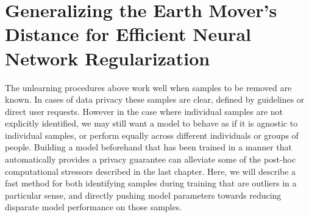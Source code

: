 \chapter{Generalizing the Earth Mover's Distance for Efficient Neural Network Regularization}\label{chap:demd}

The unlearning procedures above work well
when samples to be removed are known.
In cases of data privacy these samples are clear,
defined by guidelines or direct user requests.
However in the case where individual
samples are not explicitly identified,
we may still want a model to behave as if
it is agnostic to individual samples,
or perform equally across different individuals
or groups of people. Building a model
beforehand that has been trained in a manner
that automatically provides a privacy guarantee
can alleviate some of the post-hoc
computational stressors described in the last chapter.
Here, we will describe a fast method
for both identifying samples during training
that are outliers in a particular sense,
and directly pushing model parameters
towards reducing disparate model performance
on those samples.






